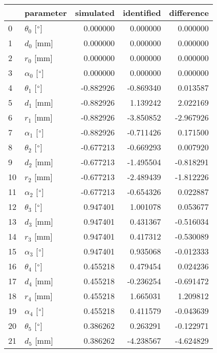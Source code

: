 \documentclass{standalone}%
\begin{document}
%
\normalsize%
\begin{tabular}{llrrr}
\toprule
{} &                 parameter & simulated & identified & difference \\
\midrule
0  &  $\theta_{0}$ [$\degree$] &  0.000000 &   0.000000 &   0.000000 \\
1  &              $d_{0}$ [mm] &  0.000000 &   0.000000 &   0.000000 \\
2  &              $r_{0}$ [mm] &  0.000000 &   0.000000 &   0.000000 \\
3  &  $\alpha_{0}$ [$\degree$] &  0.000000 &   0.000000 &   0.000000 \\
4  &  $\theta_{1}$ [$\degree$] & -0.882926 &  -0.869340 &   0.013587 \\
5  &              $d_{1}$ [mm] & -0.882926 &   1.139242 &   2.022169 \\
6  &              $r_{1}$ [mm] & -0.882926 &  -3.850852 &  -2.967926 \\
7  &  $\alpha_{1}$ [$\degree$] & -0.882926 &  -0.711426 &   0.171500 \\
8  &  $\theta_{2}$ [$\degree$] & -0.677213 &  -0.669293 &   0.007920 \\
9  &              $d_{2}$ [mm] & -0.677213 &  -1.495504 &  -0.818291 \\
10 &              $r_{2}$ [mm] & -0.677213 &  -2.489439 &  -1.812226 \\
11 &  $\alpha_{2}$ [$\degree$] & -0.677213 &  -0.654326 &   0.022887 \\
12 &  $\theta_{3}$ [$\degree$] &  0.947401 &   1.001078 &   0.053677 \\
13 &              $d_{3}$ [mm] &  0.947401 &   0.431367 &  -0.516034 \\
14 &              $r_{3}$ [mm] &  0.947401 &   0.417312 &  -0.530089 \\
15 &  $\alpha_{3}$ [$\degree$] &  0.947401 &   0.935068 &  -0.012333 \\
16 &  $\theta_{4}$ [$\degree$] &  0.455218 &   0.479454 &   0.024236 \\
17 &              $d_{4}$ [mm] &  0.455218 &  -0.236254 &  -0.691472 \\
18 &              $r_{4}$ [mm] &  0.455218 &   1.665031 &   1.209812 \\
19 &  $\alpha_{4}$ [$\degree$] &  0.455218 &   0.411579 &  -0.043639 \\
20 &  $\theta_{5}$ [$\degree$] &  0.386262 &   0.263291 &  -0.122971 \\
21 &              $d_{5}$ [mm] &  0.386262 &  -4.238567 &  -4.624829 \\

\end{tabular}
\end{document}
